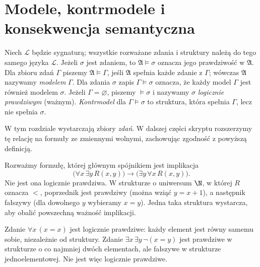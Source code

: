\section{Modele, kontrmodele i konsekwencja semantyczna}
\begin{definicja}\label{def:sem-entailment}
Niech $\mathcal L$ będzie sygnaturą; wszystkie rozważane
zdania i struktury należą do tego samego języka $\mathcal L$.
Jeżeli $\sigma$ jest zdaniem, to $\mathfrak A\models\sigma$
oznacza jego prawdziwość w $\mathfrak A$.
Dla zbioru zdań $\Gamma$ piszemy $\mathfrak A\models\Gamma$,
jeśli $\mathfrak A$ spełnia każde zdanie z $\Gamma$;
wówczas $\mathfrak A$ nazywamy \emph{modelem} $\Gamma$.
Dla zdania $\sigma$ zapis $\Gamma\models\sigma$ oznacza, że
każdy model $\Gamma$ jest również modelem $\sigma$.
Jeżeli $\Gamma=\varnothing$, piszemy $\models\sigma$
i nazywamy $\sigma$ \emph{logicznie prawdziwym} (ważnym).
\emph{Kontrmodel} dla $\Gamma\models\sigma$ to struktura,
która spełnia $\Gamma$, lecz nie spełnia $\sigma$.
\end{definicja}
W tym rozdziale wystarczają zbiory \emph{zdań}. W dalszej części
skryptu rozszerzymy tę relację na formuły ze zmiennymi
wolnymi, zachowując zgodność z powyższą definicją.

\begin{przyklad}
Rozważmy formułę, której głównym spójnikiem jest implikacja
\[
\bigl(\forall x\,\exists y\,R(x,y)\bigr)
\to\bigl(\exists y\,\forall x\,R(x,y)\bigr).
\]
Nie jest ona logicznie prawdziwa. W strukturze o uniwersum $\N$,
w której $R$ oznacza $<$, poprzednik jest prawdziwy (można wziąć $y=x+1$),
a następnik fałszywy (dla dowolnego $y$ wybieramy $x=y$).
Jedna taka struktura wystarcza, aby obalić powszechną ważność implikacji.
\end{przyklad}
\begin{przyklad}
Zdanie $\forall x\,(x=x)$ jest logicznie prawdziwe:
każdy element jest równy samemu sobie, niezależnie od struktury.
Zdanie $\exists x\,\exists y\,\neg(x=y)$ jest prawdziwe
w strukturze o co najmniej dwóch elementach, ale fałszywe
w strukturze jednoelementowej. Nie jest więc logicznie prawdziwe.
\end{przyklad}

